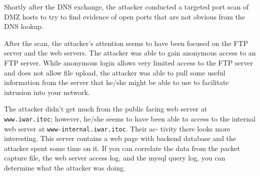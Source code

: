 \documentclass{article}
\begin{document}
Shortly after the DNS exchange, the attacker conducted a targeted port scan of DMZ hosts to try to find evidence of open ports that are not obvious from the DNS lookup.







After the scan, the attacker's attention seems to have been focused on the FTP server and the web servers. The attacker was able to gain anonymous access to an FTP server. While anonymous login allows very limited access to the FTP server and does not allow file upload, the attacker was able to pull some useful information from the server that he/she might be able to use to facilitate intrusion into your network.


The attacker didn't get much from the public facing web server at {\tt www.iwar.itoc}; however, he/she seems to have been able to access to the internal web server at {\tt www-internal.iwar.itoc}. Their ac- tivity there looks more interesting. This server contains a web page with backend database and the attacker spent some time on it. If you can correlate the data from the packet capture file, the web server access log, and the mysql query log, you can determine what the attacker was doing.






\end{document}
